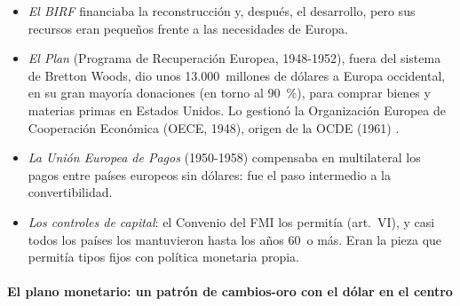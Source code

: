 \documentclass[11pt]{article}
\begin{document}
\begin{itemize}
\item \emph{El BIRF} financiaba la reconstrucción y, después, el desarrollo, pero sus recursos eran pequeños frente a las necesidades de Europa.
\item \emph{El Plan } (Programa de Recuperación Europea, 1948-1952), fuera del sistema de Bretton Woods, dio unos 13.000~millones de dólares a Europa occidental, en su gran mayoría donaciones (en torno al 90~\%), para comprar bienes y materias primas en Estados Unidos\nocite{MarshallFoundation2026Plan}. Lo gestionó la Organización Europea de Cooperación Económica (OECE, 1948), origen de la OCDE (1961) .
\item \emph{La Unión Europea de Pagos} (1950-1958) compensaba en multilateral los pagos entre países europeos sin dólares: fue el paso intermedio a la convertibilidad.
\item \emph{Los controles de capital}: el Convenio del FMI los permitía (art.~VI), y casi todos los países los mantuvieron hasta los años 60~o más. Eran la pieza que permitía tipos fijos con política monetaria propia\nocite{Eichengreen2019Globalizing}.
\end{itemize}

\paragraph{El plano monetario: un patrón de cambios-oro con el dólar en el centro}
\end{document}
